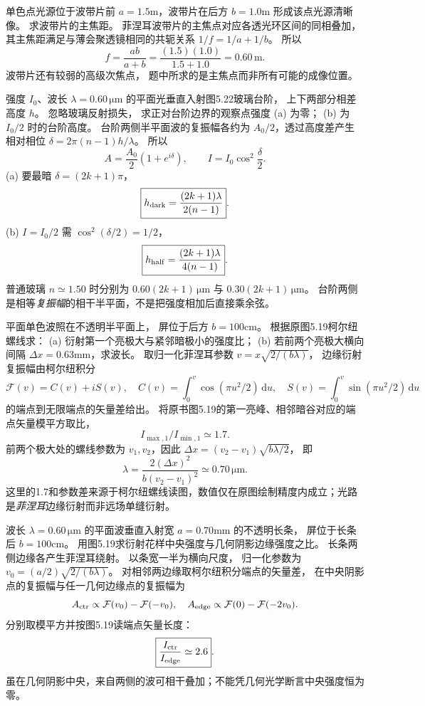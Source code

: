 单色点光源位于波带片前
$a=1.5$m，波带片在后方
$b=1.0$m 形成该点光源清晰像。
求波带片的主焦距。
\exsolution
菲涅耳波带片的主焦点对应各透光环区间的同相叠加，
其主焦距满足与薄会聚透镜相同的共轭关系
$1/f=1/a+1/b$。
所以
\[
\boxed{f=\frac{ab}{a+b}
=\frac{(1.5)(1.0)}{1.5+1.0}
=0.60\,\mathrm m}.
\]
\excheck 波带片还有较弱的高级次焦点，
题中所求的是主焦点而非所有可能的成像位置。

强度 $I_0$、波长
$\lambda=0.60\,\mathrm{\mu m}$
的平面光垂直入射图5.22玻璃台阶，
上下两部分相差高度 $h$。
忽略玻璃反射损失，
求正对台阶边界的观察点强度
(a) 为零；
(b) 为 $I_0/2$ 时的台阶高度。
\exsolution
台阶两侧半平面波的复振幅各约为
$A_0/2$，透过高度差产生相对相位
$\delta=2\pi(n-1)h/\lambda$。
所以
\[
A=\frac{A_0}{2}(1+e^{i\delta}),
\qquad
I=I_0\cos^2\frac\delta2.
\]
(a) 要最暗 $\delta=(2k+1)\pi$，
\[
\boxed{h_{\rm dark}=
\frac{(2k+1)\lambda}{2(n-1)}}.
\]
(b) $I=I_0/2$ 需 $\cos^2(\delta/2)=1/2$，
\[
\boxed{h_{\rm half}=
\frac{(2k+1)\lambda}{4(n-1)}}.
\]
普通玻璃 $n\simeq1.50$ 时分别为
$\boxed{0.60(2k+1)\,\mathrm{\mu m}}$ 与
$\boxed{0.30(2k+1)\,\mathrm{\mu m}}$。
\excheck 台阶两侧是相等\emph{复振幅}的相干半平面，不是把强度相加后直接乘余弦。

平面单色波照在不透明半平面上，
屏位于后方
$b=100$cm。
根据原图5.19柯尔纽螺线求：
(a) 衍射第一个亮极大与紧邻暗极小的强度比；
(b) 若前两个亮极大横向间隔
$\Delta x=0.63$mm，求波长。
\exsolution
取归一化菲涅耳参数
$v=x\sqrt{2/(b\lambda)}$，
边缘衍射复振幅由柯尔纽积分
\[
\mathcal F(v)=C(v)+iS(v),\quad
C(v)=\int_0^v\cos(\pi u^2/2)\,\mathrm du,\quad
S(v)=\int_0^v\sin(\pi u^2/2)\,\mathrm du
\]
的端点到无限端点的矢量差给出。
将原书图5.19的第一亮峰、相邻暗谷对应的端点矢量模平方取比，
\[
\boxed{I_{\max,1}/I_{\min,1}\simeq1.7}.
\]
前两个极大处的螺线参数为
$v_1,v_2$，因此
$\Delta x=(v_2-v_1)\sqrt{b\lambda/2}$，
即
\[
\boxed{\lambda=
\frac{2(\Delta x)^2}{b(v_2-v_1)^2}
\simeq0.70\,\mathrm{\mu m}}.
\]
\excheck 这里的1.7和参数差来源于柯尔纽螺线读图，数值仅在原图绘制精度内成立；光路是\emph{菲涅耳}边缘衍射而非远场单缝衍射。

波长 $\lambda=0.60\,\mathrm{\mu m}$ 的平面波垂直入射宽
$a=0.70$mm 的不透明长条，
屏位于长条后
$b=100$cm。
用图5.19求衍射花样中央强度与几何阴影边缘强度之比。
\exsolution
长条两侧边缘各产生菲涅耳绕射。
以条宽一半为横向尺度，
归一化参数为
$v_0=(a/2)\sqrt{2/(b\lambda)}$。
对相邻两边缘取柯尔纽积分端点的矢量差，
在中央阴影点的复振幅与任一几何边缘点的复振幅为
\[
A_{\rm ctr}\propto\mathcal F(v_0)-\mathcal F(-v_0),
\quad
A_{\rm edge}\propto
\mathcal F(0)-\mathcal F(-2v_0).
\]
分别取模平方并按图5.19读端点矢量长度：
\[
\boxed{\frac{I_{\rm ctr}}{I_{\rm edge}}\simeq2.6}.
\]
\excheck 虽在几何阴影中央，来自两侧的波可相干叠加；不能凭几何光学断言中央强度恒为零。


